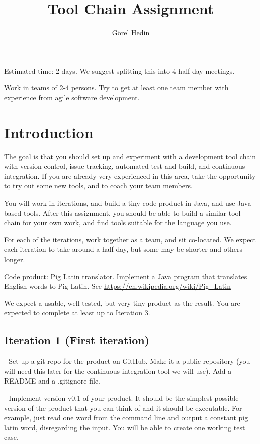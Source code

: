 \documentclass[swedish,english]{article}
\author{G{\"o}rel Hedin}
\title{Tool Chain Assignment}
\begin{document}

Estimated time: 2 days. We suggest splitting this into 4 half-day meetings.

Work in teams of 2-4 persons. Try to get at least one team member with experience from agile software development.

\section*{Introduction}

The goal is that you should set up and experiment with a development tool chain with version control, issue tracking, automated test and build, and continuous integration. If you are already very experienced in this area, take the opportunity to try out some new tools, and to coach your team members.

You will work in iterations, and build a tiny code product in Java, and use Java-based tools. After this assignment, you should be able to build a similar tool chain for your own work, and find tools suitable for the language you use. 

For each of the iterations, work together as a team, and sit co-located. We expect each iteration to take around a half day, but some may be shorter and others longer.

Code product: Pig Latin translator.
Implement a Java program that translates English words to Pig Latin. See \url{https://en.wikipedia.org/wiki/Pig_Latin}

We expect a usable, well-tested, but very tiny product as the result. You are expected to complete at least up to Iteration 3.

\subsection*{Iteration 1 (First iteration)}
- Set up a git repo for the product on GitHub. Make it a public repository (you will need this later for the continuous integration tool we will use). Add a README and a .gitignore file.

- Implement version v0.1 of your product. It should be the simplest possible version of the product that you can think of and it should be executable. For example, just read one word from the command line and output a constant pig latin word, disregarding the input. You will be able to create one working test case.
\end{document}
